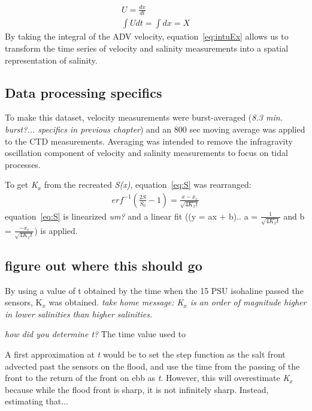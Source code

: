 \begin{eqnarray}
U = \frac{dx}{dt} \label{eq:uEdxdt}\\
\int{Udt} = \int{dx} = X \label{eq:intuEx}
\end{eqnarray}
By taking the integral of the ADV velocity, equation~\ref{eq:intuEx} allows us to transform the time series of velocity and salinity measurements into a spatial representation of salinity.

\subsection{Data processing specifics} \label{ssec:DataProcessing}
To make this dataset, velocity measurements were burst-averaged (\emph{8.3 min. burst?... specifics in previous chapter}) and an 800 sec moving average was applied to the CTD measurements.  Averaging was intended to remove the infragravity oscillation component of velocity and salinity measurements to focus on tidal processes. 

To get \emph{K$_x$} from the recreated \emph{S(x)}, equation~\ref{eq:S} was rearranged:
\begin{eqnarray}
erf^{-1}\left(\frac{2S}{S_0}-1\right) = \frac{x-x_c}{\sqrt{4K_xt}} \label{eq:linfitS}
\end{eqnarray}
equation~\ref{eq:S} is linearized \emph{um?} and a linear fit ((y = ax + b).. a = $\frac{1}{\sqrt{4K_xt}}$ and b = $\frac{-x_c}{\sqrt{4K_xt}}$) is applied. 


\subsection{figure out where this should go}

By using a value of t obtained by the time when the 15 PSU isohaline passed the sensors, K$_x$ was obtained.  \emph{take home message: K$_x$ is an order of magnitude higher in lower salinities than higher salinities. }


\emph{how did you determine t?}
The time value used to 

A first approximation at \emph{t} would be to set the step function as the salt front advected past the sensors on the flood, and use the time from the passing of the front to the return of the front on ebb as \emph{t}. However, this will overestimate \emph{K$_x$} because while the flood front is sharp, it is not infinitely sharp.  Instead, estimating that...  



